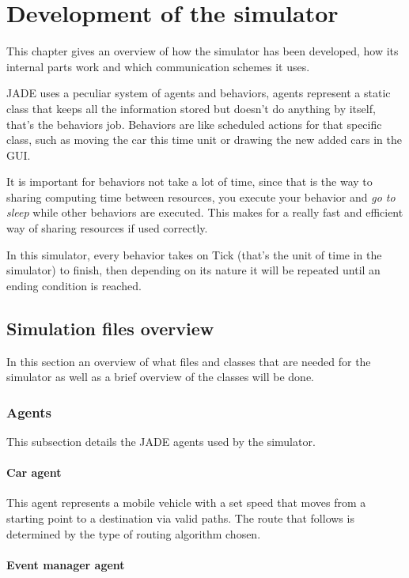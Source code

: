 \chapter{Development of the simulator}

This chapter gives an overview of how the simulator has been developed, how its internal parts work and which communication schemes it uses.

JADE uses a peculiar system of agents and behaviors, agents represent a static class that keeps all the information stored but doesn't do anything by itself, that's the behaviors job. Behaviors are like scheduled actions for that specific class, such as moving the car this time unit or drawing the new added cars in the GUI.

It is important for behaviors not take a lot of time, since that is the way to sharing computing time between resources, you execute your behavior and \textit{go to sleep} while other behaviors are executed. This makes for a really fast and efficient way of sharing resources if used correctly.

In this simulator, every behavior takes on Tick (that's the unit of time in the simulator) to finish, then depending on its nature it will be repeated until an ending condition is reached.

\section{Simulation files overview}

In this section an overview of what files and classes that are needed for the simulator as well as a brief overview of the classes will be done.

\subsection{Agents}

This subsection details the JADE agents used by the simulator.

\subsubsection{Car agent}

This agent represents a mobile vehicle with a set speed that moves from a starting point to a destination via valid paths. The route that follows is determined by the type of routing algorithm chosen.

\subsubsection{Event manager agent}

